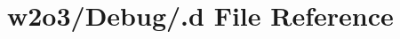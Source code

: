 \hypertarget{w2o3_2_debug_2_8d}{}\section{w2o3/\+Debug/.d File Reference}
\label{w2o3_2_debug_2_8d}
